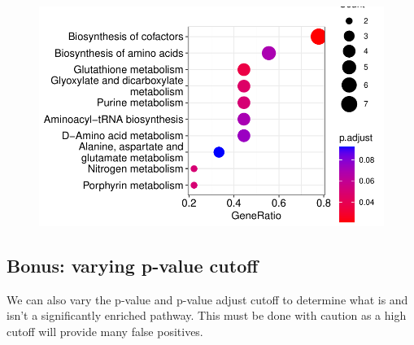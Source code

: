 \documentclass[
  24px,
  letterpaper,
  DIV=11,
  numbers=noendperiod]{scrartcl}
\newenvironment{Shaded}{\begin{snugshade}}{\end{snugshade}}
\newcommand{\AttributeTok}[1]{\textcolor[rgb]{0.40,0.45,0.13}{#1}}
\newcommand{\DecValTok}[1]{\textcolor[rgb]{0.68,0.00,0.00}{#1}}
\newcommand{\FloatTok}[1]{\textcolor[rgb]{0.68,0.00,0.00}{#1}}
\newcommand{\FunctionTok}[1]{\textcolor[rgb]{0.28,0.35,0.67}{#1}}
\newcommand{\NormalTok}[1]{\textcolor[rgb]{0.00,0.23,0.31}{#1}}
\newcommand{\OtherTok}[1]{\textcolor[rgb]{0.00,0.23,0.31}{#1}}
\newcommand{\SpecialCharTok}[1]{\textcolor[rgb]{0.37,0.37,0.37}{#1}}
\begin{document}
\begin{Shaded}
\end{Shaded}

\begin{figure}[H]

{\centering \includegraphics{index_files/figure-pdf/unnamed-chunk-27-1.pdf}

}

\end{figure}

\hypertarget{bonus-varying-p-value-cutoff}{%
\subsection{Bonus: varying p-value
cutoff}\label{bonus-varying-p-value-cutoff}}

We can also vary the p-value and p-value adjust cutoff to determine what
is and isn't a significantly enriched pathway. This must be done with
caution as a high cutoff will provide many false positives.
\end{document}
